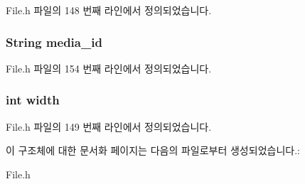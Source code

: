 File.\-h 파일의 148 번째 라인에서 정의되었습니다.

\hypertarget{struct___image_extends_af61699ef5054dcf075cbf29d59ed8d3c}{
\subsubsection[{media\-\_\-id}]{\setlength{\rightskip}{0pt plus 5cm}String media\-\_\-id}}\label{struct___image_extends_af61699ef5054dcf075cbf29d59ed8d3c}


File.\-h 파일의 154 번째 라인에서 정의되었습니다.

\hypertarget{struct___image_extends_a2474a5474cbff19523a51eb1de01cda4}{
\subsubsection[{width}]{\setlength{\rightskip}{0pt plus 5cm}int width}}\label{struct___image_extends_a2474a5474cbff19523a51eb1de01cda4}


File.\-h 파일의 149 번째 라인에서 정의되었습니다.



이 구조체에 대한 문서화 페이지는 다음의 파일로부터 생성되었습니다.\-:\begin{DoxyCompactItemize}
\item 
File.\-h\end{DoxyCompactItemize}
